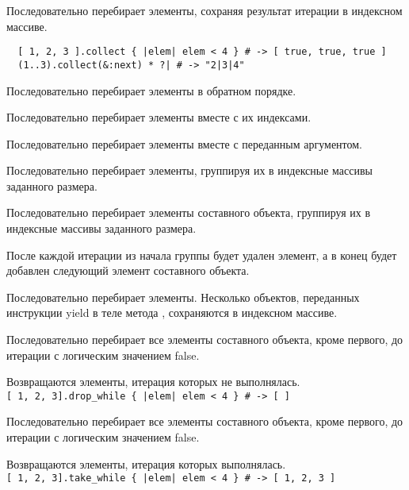 \begin{methodlist}
  Последовательно перебирает элементы, сохраняя результат итерации в индексном массиве.
  \begin{verbatim}
  [ 1, 2, 3 ].collect { |elem| elem < 4 } # -> [ true, true, true ]
  (1..3).collect(&:next) * ?| # -> "2|3|4"
  \end{verbatim}  

  Последовательно перебирает элементы в обратном порядке.
  
  Последовательно перебирает элементы вместе с их индексами. 
  
  Последовательно перебирает элементы вместе с переданным аргументом. 
  
  Последовательно перебирает элементы, группируя их в индексные массивы заданного размера. 
  
  Последовательно перебирает элементы составного объекта, группируя их в индексные массивы заданного размера. 

  После каждой итерации из начала группы будет удален элемент, а в конец будет добавлен следующий элемент составного объекта. 
  
  Последовательно перебирает элементы. Несколько объектов, переданных инструкции yield в теле метода , сохраняются в индексном массиве. 

  Последовательно перебирает все элементы составного объекта, кроме первого, до итерации с логическим значением false.

  Возвращаются элементы, итерация которых не выполнялась. 
  \\\verb![ 1, 2, 3].drop_while { |elem| elem < 4 } # -> [ ]!

  Последовательно перебирает все элементы составного объекта, кроме первого, до итерации с логическим значением false.

  Возвращаются элементы, итерация которых выполнялась. 
  \\\verb![ 1, 2, 3].take_while { |elem| elem < 4 } # -> [ 1, 2, 3 ]!


\end{methodlist}
